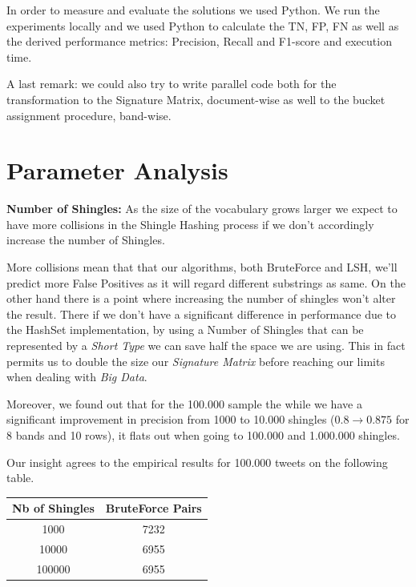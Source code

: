 \documentclass[12pt]{article}
\begin{document}
In order to measure and evaluate the solutions we used Python. We run the experiments locally and we used Python to calculate the TN, FP, FN as well as the derived performance metrics: Precision, Recall and F1-score and execution time.

A last remark: we  could also try to write parallel code both for the transformation to the Signature Matrix, document-wise as well to the bucket assignment procedure, band-wise.


\section{Parameter Analysis}


\textbf{Number of Shingles:} As the size of the vocabulary grows larger we expect to have more collisions in the Shingle Hashing process if we don't accordingly increase the number of Shingles. 

More collisions mean that that our algorithms, both BruteForce and LSH, we'll predict more False Positives as it will regard different substrings as same. On the other hand there is a point where increasing the number of shingles won't alter the result. There if we don't have a significant difference in performance due to the HashSet implementation, by using a Number of Shingles that can be represented by a \textit{Short Type} we can save half the space we are using. This in fact permits us to double the size our \textit{Signature Matrix} before reaching our limits when dealing with \textit{Big Data}.

Moreover, we found out that for the 100.000 sample the while we have a significant improvement in precision from 1000 to 10.000 shingles ($0.8 \rightarrow 0.875$ for 8 bands and 10 rows), it flats out when going to 100.000 and 1.000.000 shingles.  

Our insight agrees to the empirical results for 100.000 tweets on the following table.

\begin{center}
 \begin{tabular}{||c |  c||}
 \hline
 Nb of Shingles & BruteForce Pairs  \\ [0.5ex]
 \hline\hline
 1000 & 7232  \\
 \hline
 10000 & 6955  \\
 \hline
 100000 & 6955 \\
 \hline
\end{tabular}
\end{center}
\end{document}
